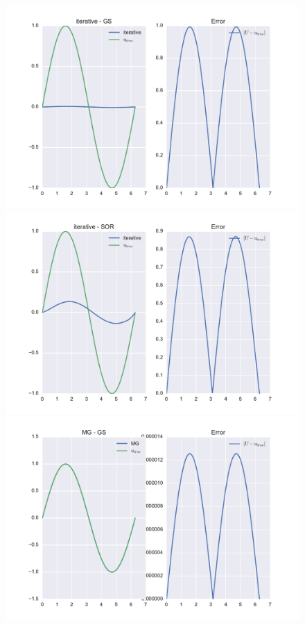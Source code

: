 \documentclass[pdftex,12pt,a4paper]{article}
\begin{document}
        \begin{figure}[h]
            \centering
            \includegraphics[scale=.4]{../plots/gs_sol_1d.pdf}
            \includegraphics[scale=.4]{../plots/sor_sol_1d.pdf} 
            \includegraphics[scale=.4]{../plots/v_sol_1d.pdf}

\end{figure}
\end{document}
